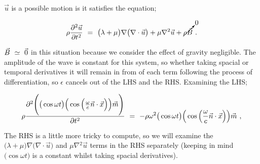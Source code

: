 \documentclass{article}
\begin{document}
\begin{math} \vec{u} \end{math} is a possible motion is it satisfies the equation;

\begin{equation} \label{eb-eq-1-144}
\rho \frac{\partial{}^2 \vec{u}}{\partial{ t }^2} \hspace{0.125cm} = \hspace{0.125cm} \big( \lambda + \mu \big) \nabla \big( \nabla \cdot \vec{u} \big) + \mu \nabla{}^2 \vec{u} + \cancelto{0}{\rho \vec{B}} \hspace{0.125cm}  . 
\end{equation}

\begin{math} \vec{B} \hspace{0.125cm} \simeq \hspace{0.125cm} \vec{0} \end{math} in this situation because we consider the effect of gravity negligible. The amplitude of the wave is constant for this system, so whether taking spacial or temporal derivatives it will remain in from of each term following the process of differentiation, so \begin{math} \epsilon \end{math} cancels out of the LHS and the RHS. Examining the LHS; 

\begin{equation} \label{eb-eq-1-145}
\rho \frac{\partial{}^2 \Bigg( \big( \cos{ \omega t } \big) \Big( \cos \Big( \frac{\omega}{c} \vec{n} \cdot \vec{x} \Big) \Big) \vec{m} \Bigg)}{\partial{ t }^2} \hspace{0.125cm} = \hspace{0.125cm} - \rho \omega{}^2 \big( \cos{ \omega t } \big) \Big( \cos \Big( \frac{\omega}{c} \vec{n} \cdot \vec{x} \Big) \Big) \vec{m} \hspace{0.125cm} ,
\end{equation}

The RHS is a little more tricky to compute, so we will examine the \begin{math} \big( \lambda + \mu \big) \nabla \big( \nabla \cdot \vec{u} \big) \end{math} and \begin{math} \mu \nabla{}^2 \vec{u} \end{math} terms in the RHS separately (keeping in mind \begin{math} \big( \cos{ \omega t } \big) \end{math} is a constant whilst taking spacial derivatives). 
\end{document}
